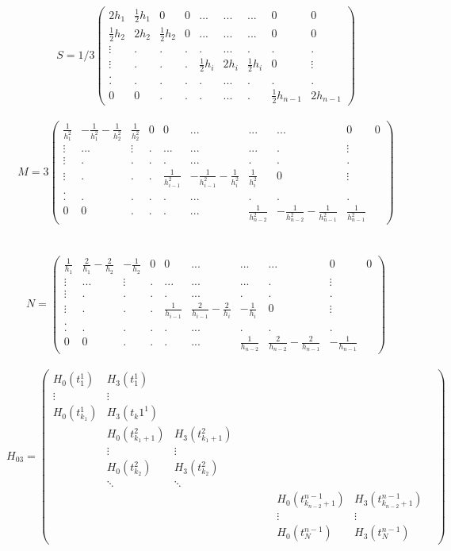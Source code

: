 \documentclass[a4paper,12pt]{article} %
\begin{document}
                
                $$S=1/3\begin{pmatrix} 2h_1&\frac{1}{2}h_1&0&0&...&...&...&0&0 \\ \frac{1}{2}h_2&2h_2&\frac{1}{2}h_2&0&...&...&...&0&0 \\ \vdots&.&.&.&.&...&.&.&.\\ \vdots&.&.&.&\frac{1}{2}h_i&2h_i&\frac{1}{2}h_i&0&\vdots \\. \\.&.&.&.&.&...&.&.&. \\ 0&0&.&.&.&...&.&\frac{1}{2}h_{n-1}&2h_{n-1} \end{pmatrix}$$\\
                $$M=3\begin{pmatrix} \frac{1}{h_1^2}&-\frac{1}{h_1^2}-\frac{1}{h_2^2}&\frac{1}{h_2^2}&0&0&...&...&...&0&0 \\ \vdots&...&\vdots&.&...&...&...&.&\vdots \\ \vdots&.&.&.&.&...&.&.&.\\ \vdots&.&.&.&\frac{1}{h_{i-1}^2}&-\frac{1}{h_{i-1}^2}-\frac{1}{h_i^2}&\frac{1}{h_i^2}&0&\vdots \\. \\.&.&.&.&.&...&.&.&. \\ 0&0&.&.&.&...&\frac{1}{h_{n-2}^2}&-\frac{1}{h_{n-2}^2}-\frac{1}{h_{n-1}^2}&\frac{1}{h_{n-1}^2} \end{pmatrix}$$
                \\
                \\$$N=\begin{pmatrix} \frac{1}{h_1}&\frac{2}{h_1}-\frac{2}{h_2}&-\frac{1}{h_2}&0&0&...&...&...&0&0 \\ \vdots&...&\vdots&.&...&...&...&.&\vdots \\ \vdots&.&.&.&.&...&.&.&.\\ \vdots&.&.&.&\frac{1}{h_{i-1}}&\frac{2}{h_{i-1}}-\frac{2}{h_i}&-\frac{1}{h_i}&0&\vdots \\. \\.&.&.&.&.&...&.&.&. \\ 0&0&.&.&.&...&\frac{1}{h_{n-2}}&\frac{2}{h_{n-2}}-\frac{2}{h_{n-1}}&-\frac{1}{h_{n-1}} \end{pmatrix}$$\\
                
                
                 $$H_{03}=\begin{pmatrix} H_0(t_1^1)&H_3(t_1^1)& & & & & & & &  \\ \vdots&\vdots& & & & & & &  \\ H_0(t_{k_1}^1)&H_3(t_k1^1)& & & & & & & \\ &H_0(t_{{k_1}+1}^2)&H_3(t_{{k_1}+1}^2)& & & & & &   \\ &\vdots&\vdots& & & & & &  \\ &H_0(t_{k_2}^2)&H_3(t_{k_2}^2)& & & & & & \\ &\ddots&\ddots & & & & & & & \\ & & & & & & &H_0(t_{{k_{n-2}}+1}^{n-1}) &H_3(t_{{k_{n-2}}+1}^{n-1})\\ & & & & & & &\vdots &\vdots\\ & & & & & & &H_0(t_N^{n-1}) &H_3(t_N^{n-1}) \end{pmatrix}$$
                
\end{document}
